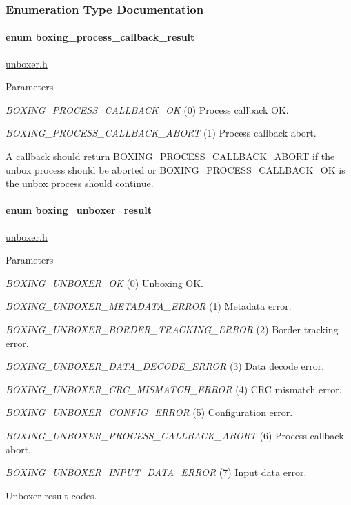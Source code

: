 \subsubsection{Enumeration Type Documentation}
\hypertarget{group__unboxer_gae2e6edbb6bac239133f13aa8164984e3}{
\paragraph[{boxing\_\-process\_\-callback\_\-result}]{\setlength{\rightskip}{0pt plus 5cm}enum {\bf boxing\_\-process\_\-callback\_\-result}}\hfill}
\label{group__unboxer_gae2e6edbb6bac239133f13aa8164984e3}
\hyperlink{unboxer_8h_source}{unboxer.h} 
\begin{DoxyParams}{Parameters}
\item[{\em BOXING\_\-PROCESS\_\-CALLBACK\_\-OK}](0) Process callback OK. \item[{\em BOXING\_\-PROCESS\_\-CALLBACK\_\-ABORT}](1) Process callback abort.\end{DoxyParams}
A callback should return BOXING\_\-PROCESS\_\-CALLBACK\_\-ABORT if the unbox process should be aborted or BOXING\_\-PROCESS\_\-CALLBACK\_\-OK is the unbox process should continue. \hypertarget{group__unboxer_ga6c7b8f994da998dcd78b154856064ca6}{
\paragraph[{boxing\_\-unboxer\_\-result}]{\setlength{\rightskip}{0pt plus 5cm}enum {\bf boxing\_\-unboxer\_\-result}}\hfill}
\label{group__unboxer_ga6c7b8f994da998dcd78b154856064ca6}
\hyperlink{unboxer_8h_source}{unboxer.h} 
\begin{DoxyParams}{Parameters}
\item[{\em BOXING\_\-UNBOXER\_\-OK}](0) Unboxing OK. \item[{\em BOXING\_\-UNBOXER\_\-METADATA\_\-ERROR}](1) Metadata error. \item[{\em BOXING\_\-UNBOXER\_\-BORDER\_\-TRACKING\_\-ERROR}](2) Border tracking error. \item[{\em BOXING\_\-UNBOXER\_\-DATA\_\-DECODE\_\-ERROR}](3) Data decode error. \item[{\em BOXING\_\-UNBOXER\_\-CRC\_\-MISMATCH\_\-ERROR}](4) CRC mismatch error. \item[{\em BOXING\_\-UNBOXER\_\-CONFIG\_\-ERROR}](5) Configuration error. \item[{\em BOXING\_\-UNBOXER\_\-PROCESS\_\-CALLBACK\_\-ABORT}](6) Process callback abort. \item[{\em BOXING\_\-UNBOXER\_\-INPUT\_\-DATA\_\-ERROR}](7) Input data error.\end{DoxyParams}
Unboxer result codes. 

